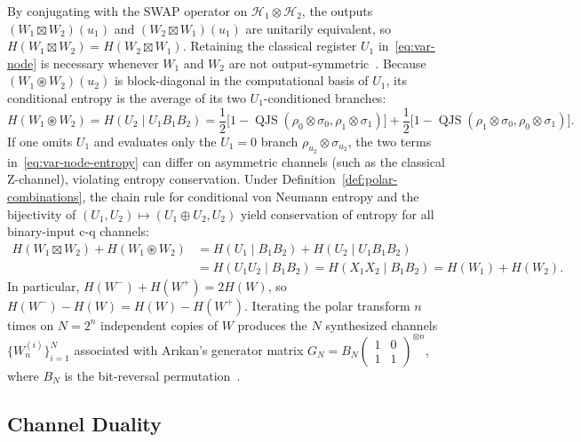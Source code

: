 \documentclass[10pt,a4paper]{article}
\numberwithin{equation}{section}
\theoremstyle{plain}
\theoremstyle{definition}
\theoremstyle{remark}
\DeclareMathOperator{\QJS}{QJS}
\newcommand{\cH}{\mathcal{H}}
\begin{document}
By conjugating with the SWAP operator on $\cH_1 \otimes \cH_2$, the outputs $(W_1 \boxtimes W_2)(u_1)$ and $(W_2 \boxtimes W_1)(u_1)$ are unitarily equivalent, so $H(W_1 \boxtimes W_2) = H(W_2 \boxtimes W_1)$. Retaining the classical register $U_1$ in~\eqref{eq:var-node} is necessary whenever $W_1$ and $W_2$ are not output-symmetric~\cite{Renes2018,HircheReeb2018}. Because $(W_1 \circledast W_2)(u_2)$ is block-diagonal in the computational basis of $U_1$, its conditional entropy is the average of its two $U_1$-conditioned branches:
\begin{equation}\label{eq:var-node-entropy}
H(W_1 \circledast W_2) = H(U_2 \mid U_1 B_1 B_2) = \frac{1}{2}\bigl[1 - \QJS(\rho_0 \otimes \sigma_0, \rho_1 \otimes \sigma_1)\bigr] + \frac{1}{2}\bigl[1 - \QJS(\rho_1 \otimes \sigma_0, \rho_0 \otimes \sigma_1)\bigr].
\end{equation}
If one omits $U_1$ and evaluates only the $U_1 = 0$ branch $\rho_{u_2} \otimes \sigma_{u_2}$, the two terms in~\eqref{eq:var-node-entropy} can differ on asymmetric channels (such as the classical Z-channel), violating entropy conservation. Under Definition~\ref{def:polar-combinations}, the chain rule for conditional von Neumann entropy and the bijectivity of $(U_1, U_2) \mapsto (U_1 \oplus U_2, U_2)$ yield conservation of entropy for all binary-input c-q channels:
\begin{equation}\label{eq:entropy-conservation}
\begin{aligned}
H(W_1 \boxtimes W_2) + H(W_1 \circledast W_2) &= H(U_1 \mid B_1 B_2) + H(U_2 \mid U_1 B_1 B_2)\\
&= H(U_1 U_2 \mid B_1 B_2) = H(X_1 X_2 \mid B_1 B_2) = H(W_1) + H(W_2).
\end{aligned}
\end{equation}
In particular, $H(W^-) + H(W^+) = 2 H(W)$, so $H(W^-) - H(W) = H(W) - H(W^+)$. Iterating the polar transform $n$ times on $N = 2^n$ independent copies of $W$ produces the $N$ synthesized channels $\{W_n^{(i)}\}_{i=1}^{N}$ associated with Ar{\i}kan's generator matrix $G_N = B_N \left(\begin{smallmatrix} 1 & 0 \\ 1 & 1 \end{smallmatrix}\right)^{\otimes n}$, where $B_N$ is the bit-reversal permutation~\cite{Arikan2009,WildeGuha2013}.

\subsection{Channel Duality}
\end{document}
